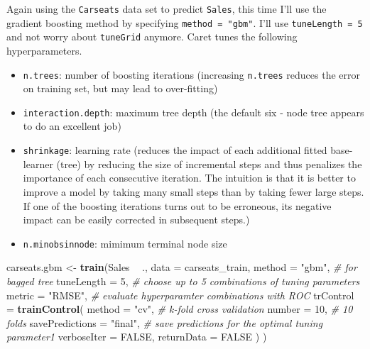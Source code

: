 \documentclass[
]{book}
\newenvironment{Shaded}{\begin{snugshade}}{\end{snugshade}}
\newcommand{\CommentTok}[1]{\textcolor[rgb]{0.56,0.35,0.01}{\textit{#1}}}
\newcommand{\DataTypeTok}[1]{\textcolor[rgb]{0.13,0.29,0.53}{#1}}
\newcommand{\DecValTok}[1]{\textcolor[rgb]{0.00,0.00,0.81}{#1}}
\newcommand{\KeywordTok}[1]{\textcolor[rgb]{0.13,0.29,0.53}{\textbf{#1}}}
\newcommand{\NormalTok}[1]{#1}
\newcommand{\OperatorTok}[1]{\textcolor[rgb]{0.81,0.36,0.00}{\textbf{#1}}}
\newcommand{\OtherTok}[1]{\textcolor[rgb]{0.56,0.35,0.01}{#1}}
\newcommand{\StringTok}[1]{\textcolor[rgb]{0.31,0.60,0.02}{#1}}
\providecommand{\tightlist}{%
  \setlength{\itemsep}{0pt}\setlength{\parskip}{0pt}}
\begin{document}
Again using the \texttt{Carseats} data set to predict \texttt{Sales}, this time I'll use the gradient boosting method by specifying \texttt{method\ =\ "gbm"}. I'll use \texttt{tuneLength\ =\ 5} and not worry about \texttt{tuneGrid} anymore. Caret tunes the following hyperparameters.

\begin{itemize}
\tightlist
\item
  \texttt{n.trees}: number of boosting iterations (increasing \texttt{n.trees} reduces the error on training set, but may lead to over-fitting)
\item
  \texttt{interaction.depth}: maximum tree depth (the default six - node tree appears to do an excellent job)
\item
  \texttt{shrinkage}: learning rate (reduces the impact of each additional fitted base-learner (tree) by reducing the size of incremental steps and thus penalizes the importance of each consecutive iteration. The intuition is that it is better to improve a model by taking many small steps than by taking fewer large steps. If one of the boosting iterations turns out to be erroneous, its negative impact can be easily corrected in subsequent steps.)
\item
  \texttt{n.minobsinnode}: mimimum terminal node size
\end{itemize}

\begin{Shaded}
\begin{Highlighting}[]
\NormalTok{carseats.gbm <-}\StringTok{ }\KeywordTok{train}\NormalTok{(Sales }\OperatorTok{~}\StringTok{ }\NormalTok{., }
                      \DataTypeTok{data =}\NormalTok{ carseats_train, }
                      \DataTypeTok{method =} \StringTok{"gbm"}\NormalTok{,  }\CommentTok{# for bagged tree}
                      \DataTypeTok{tuneLength =} \DecValTok{5}\NormalTok{,  }\CommentTok{# choose up to 5 combinations of tuning parameters}
                      \DataTypeTok{metric =} \StringTok{"RMSE"}\NormalTok{,  }\CommentTok{# evaluate hyperparamter combinations with ROC}
                      \DataTypeTok{trControl =} \KeywordTok{trainControl}\NormalTok{(}
                        \DataTypeTok{method =} \StringTok{"cv"}\NormalTok{,  }\CommentTok{# k-fold cross validation}
                        \DataTypeTok{number =} \DecValTok{10}\NormalTok{,  }\CommentTok{# 10 folds}
                        \DataTypeTok{savePredictions =} \StringTok{"final"}\NormalTok{,       }\CommentTok{# save predictions for the optimal tuning parameter1}
                        \DataTypeTok{verboseIter =} \OtherTok{FALSE}\NormalTok{,}
                        \DataTypeTok{returnData =} \OtherTok{FALSE}
\NormalTok{                        )}
\NormalTok{                      )}
\end{Highlighting}
\end{Shaded}
\end{document}
